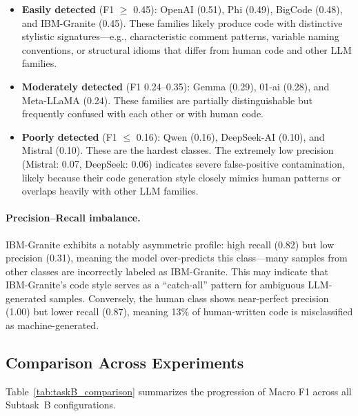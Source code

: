 \documentclass[11pt]{article}
\begin{document}
\begin{itemize}
    \item \textbf{Easily detected} (F1 $\geq$ 0.45): OpenAI (0.51), Phi (0.49), BigCode (0.48), and IBM-Granite (0.45). These families likely produce code with distinctive stylistic signatures---e.g., characteristic comment patterns, variable naming conventions, or structural idioms that differ from human code and other LLM families.
    \item \textbf{Moderately detected} (F1 0.24--0.35): Gemma (0.29), 01-ai (0.28), and Meta-LLaMA (0.24). These families are partially distinguishable but frequently confused with each other or with human code.
    \item \textbf{Poorly detected} (F1 $\leq$ 0.16): Qwen (0.16), DeepSeek-AI (0.10), and Mistral (0.10). These are the hardest classes. The extremely low precision (Mistral: 0.07, DeepSeek: 0.06) indicates severe false-positive contamination, likely because their code generation style closely mimics human patterns or overlaps heavily with other LLM families.
\end{itemize}

\paragraph{Precision--Recall imbalance.} IBM-Granite exhibits a notably asymmetric profile: high recall (0.82) but low precision (0.31), meaning the model over-predicts this class---many samples from other classes are incorrectly labeled as IBM-Granite. This may indicate that IBM-Granite's code style serves as a ``catch-all'' pattern for ambiguous LLM-generated samples. Conversely, the human class shows near-perfect precision (1.00) but lower recall (0.87), meaning 13\% of human-written code is misclassified as machine-generated.

\subsection{Comparison Across Experiments}

Table~\ref{tab:taskB_comparison} summarizes the progression of Macro F1 across all Subtask~B configurations.
\end{document}
